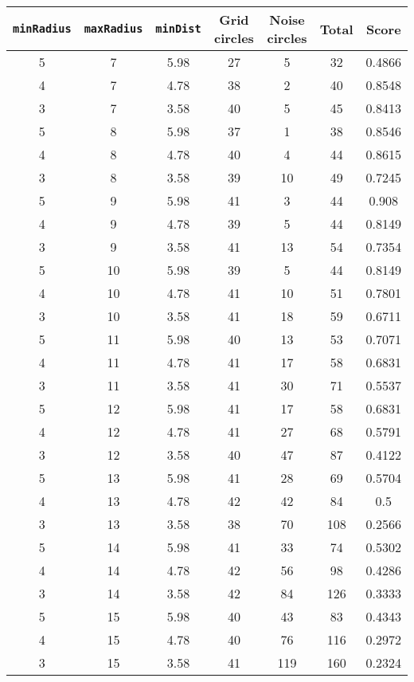 \documentclass[letterpaper, 12pt]{article}
\begin{document}
\begin{longtable}{|c|c|c|c|c|c|c|}
\hline
\textbf{\texttt{minRadius}} & \textbf{\texttt{maxRadius}} & \textbf{\texttt{minDist}} & \textbf{Grid circles} & \textbf{Noise circles} & \textbf{Total} & \textbf{Score} \\
\hline
5 & 7 & 5.98 & 27 & 5 & 32 & 0.4866 \\
\hline
4 & 7 & 4.78 & 38 & 2 & 40 & 0.8548 \\
\hline
3 & 7 & 3.58 & 40 & 5 & 45 & 0.8413 \\
\hline
5 & 8 & 5.98 & 37 & 1 & 38 & 0.8546 \\
\hline
4 & 8 & 4.78 & 40 & 4 & 44 & 0.8615 \\
\hline
3 & 8 & 3.58 & 39 & 10 & 49 & 0.7245 \\
\hline
5 & 9 & 5.98 & 41 & 3 & 44 & 0.908 \\
\hline
4 & 9 & 4.78 & 39 & 5 & 44 & 0.8149 \\
\hline
3 & 9 & 3.58 & 41 & 13 & 54 & 0.7354 \\
\hline
5 & 10 & 5.98 & 39 & 5 & 44 & 0.8149 \\
\hline
4 & 10 & 4.78 & 41 & 10 & 51 & 0.7801 \\
\hline
3 & 10 & 3.58 & 41 & 18 & 59 & 0.6711 \\
\hline
5 & 11 & 5.98 & 40 & 13 & 53 & 0.7071 \\
\hline
4 & 11 & 4.78 & 41 & 17 & 58 & 0.6831 \\
\hline
3 & 11 & 3.58 & 41 & 30 & 71 & 0.5537 \\
\hline
5 & 12 & 5.98 & 41 & 17 & 58 & 0.6831 \\
\hline
4 & 12 & 4.78 & 41 & 27 & 68 & 0.5791 \\
\hline
3 & 12 & 3.58 & 40 & 47 & 87 & 0.4122 \\
\hline
5 & 13 & 5.98 & 41 & 28 & 69 & 0.5704 \\
\hline
4 & 13 & 4.78 & 42 & 42 & 84 & 0.5 \\
\hline
3 & 13 & 3.58 & 38 & 70 & 108 & 0.2566 \\
\hline
5 & 14 & 5.98 & 41 & 33 & 74 & 0.5302 \\
\hline
4 & 14 & 4.78 & 42 & 56 & 98 & 0.4286 \\
\hline
3 & 14 & 3.58 & 42 & 84 & 126 & 0.3333 \\
\hline
5 & 15 & 5.98 & 40 & 43 & 83 & 0.4343 \\
\hline
4 & 15 & 4.78 & 40 & 76 & 116 & 0.2972 \\
\hline
3 & 15 & 3.58 & 41 & 119 & 160 & 0.2324 \\

\end{longtable}
\end{document}
